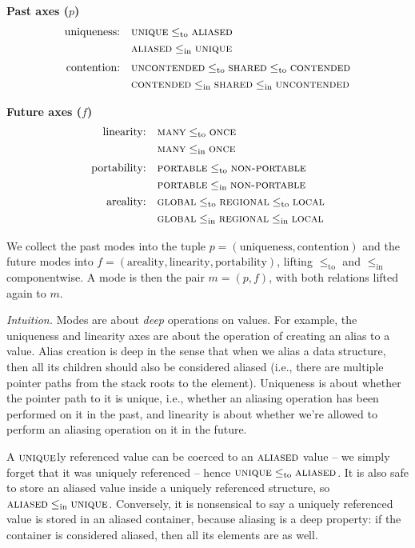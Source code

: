 \documentclass{article}
\newcommand{\leqto}{\mathrel{\leq_{\mathrm{to}}}}
\newcommand{\leqin}{\mathrel{\leq_{\mathrm{in}}}}
\newcommand{\mode}[1]{\textsc{#1}}
\begin{document}
\medskip
\noindent\textbf{Past axes ($p$)}
\[
\begin{alignedat}{2}
\text{uniqueness:}&\quad \mode{unique} \leqto \mode{aliased}\\
&\quad \mode{aliased} \leqin \mode{unique}\\[0.5ex]
\text{contention:}&\quad \mode{uncontended} \leqto \mode{shared} \leqto \mode{contended}\\
&\quad \mode{contended} \leqin \mode{shared} \leqin \mode{uncontended}
\end{alignedat}
\]

\medskip
\noindent\textbf{Future axes ($f$)}
\[
\begin{alignedat}{2}
\text{linearity:}&\quad \mode{many} \leqto \mode{once}\\
&\quad \mode{many} \leqin \mode{once}\\[0.5ex]
\text{portability:}&\quad \mode{portable} \leqto \mode{non-portable}\\
&\quad \mode{portable} \leqin \mode{non-portable}\\
\text{areality:}&\quad \mode{global} \leqto \mode{regional} \leqto \mode{local}\\
&\quad \mode{global} \leqin \mode{regional} \leqin \mode{local}
\end{alignedat}
\]

\medskip                               
We collect the past modes into the tuple $p = (\text{uniqueness}, \text{contention})$ and the future modes into $f = (\text{areality}, \text{linearity}, \text{portability})$, lifting $\leqto$ and $\leqin$ componentwise.
A mode is then the pair $m = (p, f)$, with both relations lifted again to $m$.

\noindent\emph{Intuition.}
Modes are about \emph{deep} operations on values. For example, the uniqueness and linearity axes are about the operation of creating an alias to a value. Alias creation is deep in the sense that when we alias a data structure, then all its children should also be considered aliased (i.e., there are multiple pointer paths from the stack roots to the element). Uniqueness is about whether the pointer path to it is unique, i.e., whether an aliasing operation has been performed on it in the past, and linearity is about whether we're allowed to perform an aliasing operation on it in the future.

A $\mode{unique}$ly referenced value can be coerced to an $\mode{aliased}$ value -- we simply forget that it was uniquely referenced -- hence $\mode{unique} \leqto \mode{aliased}$. It is also safe to store an aliased value inside a uniquely referenced structure, so $\mode{aliased} \leqin \mode{unique}$. Conversely, it is nonsensical to say a uniquely referenced value is stored in an aliased container, because aliasing is a deep property: if the container is considered aliased, then all its elements are as well.
\end{document}
